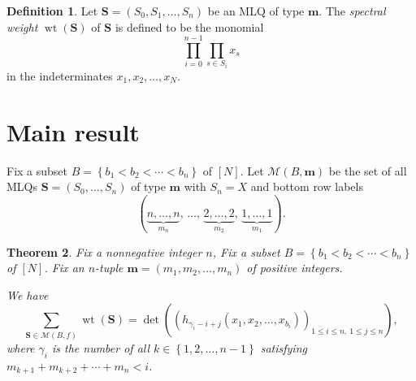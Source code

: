 \documentclass[reqno]{amsart}
\newcommand{\fs}{\mathcal{S}} %
\DeclareMathOperator{\wt}{wt} %
\newcommand{\xx}{\mathbf{x}}
\newcommand{\mm}{\mathbf{m}}
\newcommand{\MLQ}{\mathbf{S}}
\newcommand{\mcF}{\mathcal{F}}
\newcommand{\mcM}{\mathcal{M}}
\let\sumnonlimits\sum
\let\prodnonlimits\prod
\renewcommand{\sum}{\sumnonlimits\limits}
\renewcommand{\prod}{\prodnonlimits\limits}
\newcommand{\set}[1]{\left\{ #1 \right\}}
\newcommand{\tup}[1]{\left( #1 \right)}
\newcommand{\ive}[1]{\left[ #1 \right]}
\newcommand{\defn}[1]{{\color{darkred}\emph{#1}}} %
\theoremstyle{plain}
\newtheorem{thm}{Theorem}[section]
\theoremstyle{definition}
\newtheorem{dfn}[thm]{Definition}
\numberwithin{equation}{section}
\begin{document}
\begin{dfn} \label{def.mlq.sw}
Let $\MLQ = \tup{S_0, S_1, \ldots, S_n}$ be an MLQ of type $\mm$.
The \defn{spectral weight} $\wt\tup{\MLQ}$
of $\MLQ$ is defined to be the monomial
\[
 \prod_{i=0}^{n-1} \prod_{s \in S_i} x_s
\]
in the indeterminates $x_1, x_2, \ldots, x_N$.
\end{dfn}


%








\section{Main result}
\label{sec:result}


Fix a subset $B = \set{b_1 < b_2 < \cdots < b_n}$ of $\ive{N}$.
Let $\mcM \tup{B, \mm}$ be the set of all MLQs $\MLQ = (S_0, \dotsc, S_n)$ of type $\mm$
with $S_n = X$ and bottom row labels
\[
(\underbrace{n, \dotsc, n}_{m_n},\, \dotsc,\, \underbrace{2, \dotsc, 2}_{m_2},\, \underbrace{1, \dotsc, 1}_{m_1}).
\]

\begin{thm} \label{thm.decreasing}
Fix a nonnegative integer $n$,
Fix a subset $B = \set{b_1 < b_2 < \cdots < b_n}$ of $\ive{N}$.
Fix an $n$-tuple $\mm = \tup{m_1, m_2, \ldots, m_n}$ of positive integers.

We have
\[
\sum_{\MLQ \in \mcM \tup{B, f}} \wt\tup{\MLQ}
= \det \tup{
             \tup{ h_{\gamma_i - i + j} \tup{x_1, x_2, \ldots, x_{b_i}}
                 }_{1 \leq i \leq n, \  1 \leq j \leq n}
           },
\]
where $\gamma_i$ is the number of all
$k \in \set{1, 2, \ldots, n-1}$ satisfying
$m_{k + 1} + m_{k + 2} + \cdots + m_n < i$.
\end{thm}
\end{document}
